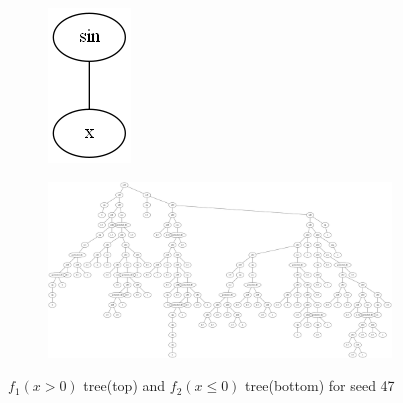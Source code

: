 \documentclass{article}
\begin{document}
\begin{figure}[h!]
	\centering
	\begin{subfigure}[b]{\linewidth}
		\includegraphics[width=0.1\linewidth]{ccgp_best_tree_47_1.png}
	\end{subfigure}
	\begin{subfigure}[b]{\linewidth}
		\includegraphics[width=\linewidth]{ccgp_best_tree_47_2.png}
	\end{subfigure}
	\caption{$f_1(x > 0)$ tree(top) and $f_2(x \le 0)$ tree(bottom) for seed 47}
\end{figure}
\end{document}
